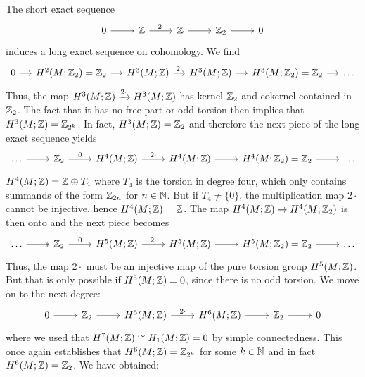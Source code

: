 \documentclass{scrartcl}
\begin{document}
\medskip

The short exact sequence
\begin{equation*}
	\begin{tikzcd}
		0 \ar[r] & \Z \ar[r,"2\cdot"] & \Z \ar[r] & \Z_2 \ar[r] & 0
	\end{tikzcd}
\end{equation*}
induces a long exact sequence on cohomology. We find
\begin{equation*}
	\begin{tikzcd}[column sep=small]
		0\ar[r] & H^2(M;\Z_2)=\Z_2 \ar[r] & H^3(M;\Z) \ar[r,"2\cdot"] & H^3(M;\Z) \ar[r] 
		& H^3(M;\Z_2)=\Z_2 \ar[r] & \dots
	\end{tikzcd}
\end{equation*}
Thus, the map $H^3(M;\mathbb{Z})\xrightarrow{2\cdot}H^3(M;\mathbb{Z})$ has kernel $\mathbb{Z}_2$ and cokernel contained in $\mathbb{Z}_2$. The fact that it has no free part or odd torsion then implies that $H^3(M;\mathbb{Z})=\mathbb{Z}_{2^k}$.
In fact, $H^3(M;\mathbb{Z})=\mathbb{Z}_2$ and therefore the next piece of the long exact sequence yields
\begin{equation*}
	\begin{tikzcd}
		\dots\ar[r] & \Z_2 \ar[r,"0"] & H^4(M;\Z) \ar[r,"2\cdot"] & H^4(M;\Z) \ar[r] & H^4(M;\Z_2)=\Z_2 \ar[r] & \dots
	\end{tikzcd}
\end{equation*}
$H^4(M;\mathbb{Z})=\mathbb{Z}\oplus T_4$ where $T_4$ is the torsion in degree four, which only contains summands of the form $\mathbb{Z}_{2n}$ for $n\in \mathbb{N}$. But if $T_4\neq \{0\}$, the multiplication map $2\cdot$ cannot be injective, hence $H^4(M;\mathbb{Z})=\mathbb{Z}$. The map $H^4(M;\mathbb{Z})\to H^4(M;\mathbb{Z}_2)$ is then onto and the next piece becomes
\begin{equation*}
	\begin{tikzcd}
		\dots \ar[r,two heads] & \Z_2 \ar[r,"0"] & H^5(M;\Z) \ar[r,"2\cdot"] 
		&H^5(M;\Z) \ar[r] & H^5(M;\Z_2)=\Z_2 \ar[r] &\dots
	\end{tikzcd}
\end{equation*}
Thus, the map $2\cdot$ must be an injective map of the pure torsion group $H^5(M;\mathbb{Z})$. But that is only possible if $H^5(M;\mathbb{Z})=0$, since there is no odd torsion. We move on to the next degree:
\begin{equation*}
	\begin{tikzcd}
		0\ar[r] & \Z_2 \ar[r] & H^6(M;\Z) \ar[r,"2\cdot"] 
		& H^6(M;\Z) \ar[r] & \Z_2 \ar[r] & 0
	\end{tikzcd}
\end{equation*}
where we used that $H^7(M;\mathbb{Z})\cong H_1(M;\mathbb{Z})=0$ by simple connectedness. This once again establishes that $H^6(M;\mathbb{Z})=\mathbb{Z}_{2^k}$ for some $k\in \mathbb{N}$
and in fact $H^6(M;\mathbb{Z})=\mathbb{Z}_2$. We have obtained:
\end{document}
